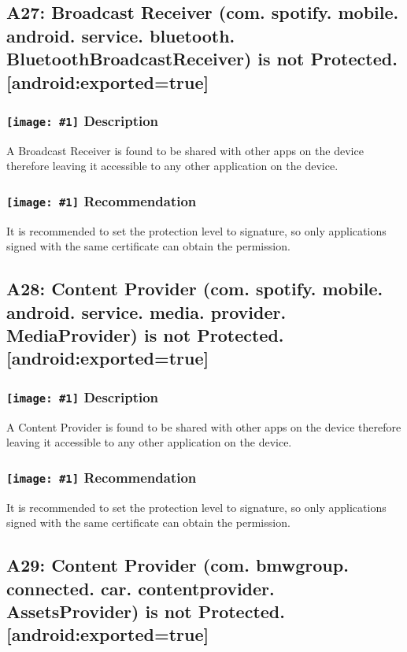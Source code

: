 \documentclass[12p]{article}
\newcommand{\icon}[1]{\texttt{[image: \#1]}}
\begin{document}
\subsection{A27: Broadcast Receiver (com. spotify. mobile. android. service. bluetooth. BluetoothBroadcastReceiver) is not Protected. [android:exported=true]}
\subsubsection*{\protect\icon{/home/miki/Documents/GITHUB/AndroidPermissions/python/vulns/report_icons/basic_sheet.png} Description}
A Broadcast Receiver is found to be shared with other apps on the device therefore leaving it accessible to any other application on the device.
\subsubsection*{\protect\icon{/home/miki/Documents/GITHUB/AndroidPermissions/python/vulns/report_icons/basic_todo.png} Recommendation}
It is recommended to set the protection level to signature, so only applications signed with the same certificate can obtain the permission.
\subsection{A28: Content Provider (com. spotify. mobile. android. service. media. provider. MediaProvider) is not Protected. [android:exported=true]}
\subsubsection*{\protect\icon{/home/miki/Documents/GITHUB/AndroidPermissions/python/vulns/report_icons/basic_sheet.png} Description}
A Content Provider is found to be shared with other apps on the device therefore leaving it accessible to any other application on the device.
\subsubsection*{\protect\icon{/home/miki/Documents/GITHUB/AndroidPermissions/python/vulns/report_icons/basic_todo.png} Recommendation}
It is recommended to set the protection level to signature, so only applications signed with the same certificate can obtain the permission.
\subsection{A29: Content Provider (com. bmwgroup. connected. car. contentprovider. AssetsProvider) is not Protected. [android:exported=true]}
\end{document}

